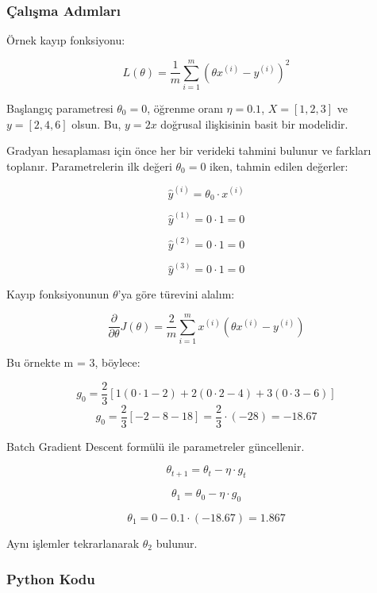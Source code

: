 \subsubsection{Çalışma Adımları}

Örnek kayıp fonksiyonu:

\[ L(\theta) = \frac{1}{m} \sum_{i=1}^{m} (\theta x^{(i)} - y^{(i)})^2 \]

Başlangıç parametresi $\theta_0 = 0$, öğrenme oranı $\eta = 0.1$, $X = [1, 2, 3]$ ve $y = [2, 4, 6]$ olsun. Bu, $y = 2x$ doğrusal ilişkisinin basit bir modelidir.

Gradyan hesaplaması için önce her bir verideki tahmini bulunur ve farkları toplanır. Parametrelerin ilk değeri $\theta_0 = 0$ iken, tahmin edilen değerler:

\[ \hat{y}^{(i)} = \theta_0 \cdot x^{(i)} \]

\[ \hat{y}^{(1)} = 0 \cdot 1 = 0 \]

\[ \hat{y}^{(2)} = 0 \cdot 1 = 0 \]

\[ \hat{y}^{(3)} = 0 \cdot 1 = 0 \]

Kayıp fonksiyonunun $\theta$'ya göre türevini alalım:

\[ \frac{\partial}{\partial \theta} J(\theta) = \frac{2}{m} \sum_{i=1}^{m} x^{(i)} (\theta x^{(i)} - y^{(i)}) \]

Bu örnekte m = 3, böylece:

\[ g_0 = \frac{2}{3} [1(0 \cdot 1 - 2) + 2(0 \cdot 2 - 4) + 3(0 \cdot 3 - 6)] \]
\[ g_0 = \frac{2}{3} [- 2 - 8 - 18] = \frac{2}{3} \cdot (-28) = -18.67 \]

Batch Gradient Descent formülü ile parametreler güncellenir.

\[ \theta_{t+1} = \theta_t - \eta \cdot g_t \]

\[ \theta_1 = \theta_0 - \eta \cdot g_0 \]

\[ \theta_1 = 0 - 0.1 \cdot (-18.67) = 1.867 \]

Aynı işlemler tekrarlanarak $\theta_2$ bulunur.

\subsubsection{Python Kodu}

